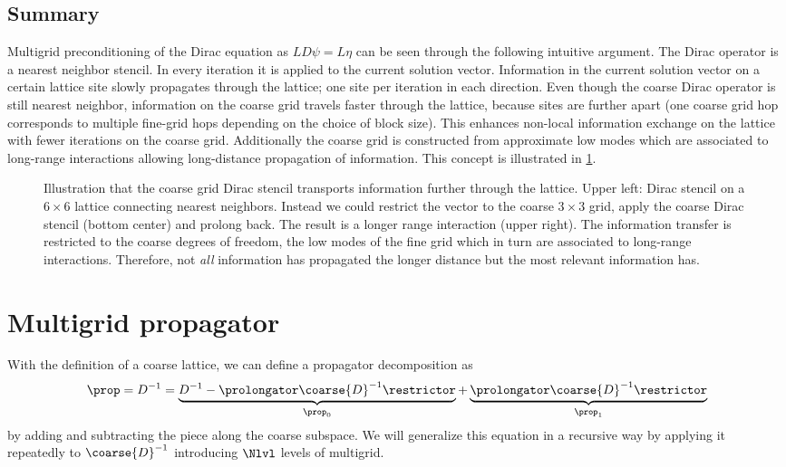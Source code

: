 \subsection{Summary}

Multigrid preconditioning of the Dirac equation as $L D \psi = L \eta$ can be seen through the following intuitive argument.
The Dirac operator is a nearest neighbor stencil.
In every iteration it is applied to the current solution vector.
Information in the current solution vector on a certain lattice site slowly propagates through the lattice; one site per iteration in each direction.
Even though the coarse Dirac operator is still nearest neighbor, information on the coarse grid travels faster through the lattice, because sites are further apart (\ie one coarse grid hop corresponds to multiple fine-grid hops depending on the choice of block size).
This enhances non-local information exchange on the lattice with fewer iterations on the coarse grid.
Additionally the coarse grid is constructed from approximate low modes which are associated to long-range interactions allowing long-distance propagation of information.
This concept is illustrated in \cref{fig:coarse:stencil}.

\begin{figure}
\centering

\caption{Illustration that the coarse grid Dirac stencil transports information further through the lattice. Upper left: Dirac stencil on a $6 \times 6$ lattice connecting nearest neighbors. Instead we could restrict the vector to the coarse $3 \times 3$ grid, apply the coarse Dirac stencil (bottom center) and prolong back. The result is a longer range interaction (upper right). The information transfer is restricted to the coarse degrees of freedom, \ie the low modes of the fine grid which in turn are associated to long-range interactions. Therefore, not \emph{all} information has propagated the longer distance but the most relevant information has.}
\label{fig:coarse:stencil}
\end{figure}

\section{Multigrid propagator}
\label{sec:mg:prop}

With the definition of a coarse lattice, we can define a propagator decomposition as
\begin{equation} \label{eq:mg:prop:decomp:2lvl}
\prop = D^{-1}
= \underbrace{
  D^{-1}
  - \prolongator \coarse{D}^{-1} \restrictor
}_{\prop_0}
+ \underbrace{
  \prolongator \coarse{D}^{-1} \restrictor
}_{\prop_1}
\end{equation}
by adding and subtracting the piece along the coarse subspace.
We will generalize this equation in a recursive way by applying it repeatedly to $\coarse{D}^{-1}$ introducing $\Nlvl$ levels of multigrid.

